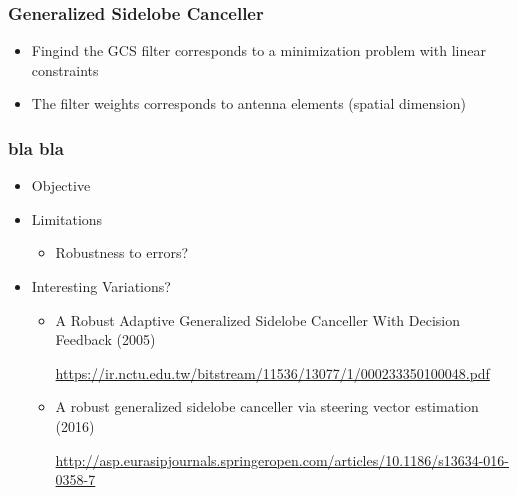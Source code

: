 \documentclass{beamer}
\begin{document}
\begin{frame}
  \frametitle{Generalized Sidelobe Canceller}

  \begin{itemize}
    \item Fingind the GCS filter corresponds to a minimization problem with linear
    constraints
    
    \item The filter weights corresponds to antenna elements (spatial dimension)
  \end{itemize}
\end{frame}



\begin{frame}
  \frametitle{bla bla}


  \begin{itemize}
    \item Objective
    \item Limitations
    
    \begin{itemize}
      \item Robustness to errors?
    \end{itemize}
    
    \item Interesting Variations?
    \begin{itemize}
      \item A Robust Adaptive Generalized Sidelobe Canceller
      With Decision Feedback (2005)

      \url{https://ir.nctu.edu.tw/bitstream/11536/13077/1/000233350100048.pdf}
      
      \item A robust generalized sidelobe canceller via steering vector estimation (2016)

      \url{http://asp.eurasipjournals.springeropen.com/articles/10.1186/s13634-016-0358-7}
      
    \end{itemize}
  \end{itemize}
\end{frame}
\end{document}
